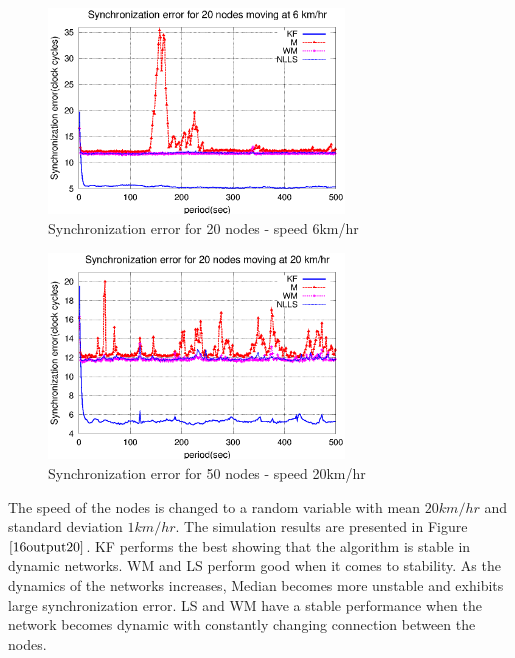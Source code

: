 \documentclass[a4paper,10pt]{report}
\begin{document}
\paragraph*{}
\begin{figure}
\centering
\includegraphics[width=0.7\textwidth]{16output-s6}
\caption{Synchronization error for 20 nodes - speed 6km/hr} \label{16output6}
\end{figure}
\begin{figure}
\centering
\includegraphics[width=0.7\textwidth]{16output-s20}
\caption{Synchronization error for 50 nodes - speed 20km/hr}
\label{16output20}
\end{figure}
The speed of the nodes is changed to a random variable with mean
$20km/hr$ and standard deviation $1km/hr$. The simulation results
are presented in Figure $\ref{16output20}$. KF performs the best
showing that the algorithm is stable in dynamic networks. WM and LS
perform good when it comes to stability. As the dynamics of the
networks increases, Median becomes more unstable and exhibits large
synchronization error. LS and WM have a stable performance when the
network becomes dynamic with constantly changing connection between
the nodes.
\end{document}
